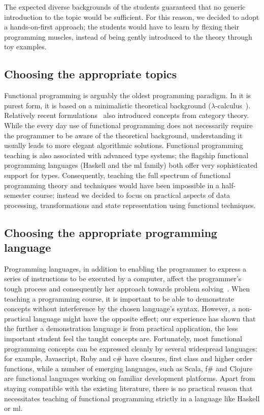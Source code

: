 \documentclass[conference]{IEEEtran}
\begin{document}
The expected diverse backgrounds of the students guaranteed that no generic
introduction to the topic would be sufficient. For this reason, we decided
to adopt a hands-on-first approach; the students would have to learn by
flexing their programming muscles, instead of being gently introduced to 
the theory through toy examples.

\subsection{Choosing the appropriate topics}

Functional programming is arguably the oldest programming paradigm. In it is
purest form, it is based on a minimalistic theoretical background
($\lambda$-calculus~\cite{Baren84}). Relatively recent
formulations~\cite{Meije91, Wadle93} also introduced concepts from category
theory. While the every day use of functional programming does not necessarily
require the programmer to be aware of the theoretical background, understanding
it usually leads to more elegant algorithmic solutions. Functional
programming teaching is also associated with advanced type systems; the flagship
functional programming languages (Haskell and the {\sc ml} family) both offer
very sophisticated support for types. Consequently, teaching the full spectrum
of functional programming theory and techniques would have been impossible in a
half-semester course; instead we decided to focus on practical aspects of data
processing, transformations and state representation using functional techniques.

\subsection{Choosing the appropriate programming language}

Programming languages, in addition to enabling the programmer to express a
series of instructions to be executed by a computer, affect the programmer's
tough process and consequently her approach towards problem
solving~\cite{Ivers80}.  When teaching a programming course, it is important to
be able to demonstrate concepts without interference by the chosen language's
syntax. However, a non-practical language might have the opposite effect; our
experience has shown that the further a demonstration language is from practical
application, the less important student feel the taught concepts are.
Fortunately, most functional programming concepts can be expressed cleanly by
several widespread languages: for example, Javascript, Ruby and {\sc c\#} have
closures, first class and higher order functions, while a number of emerging
languages, such as Scala, {\sc f\#} and Clojure are functional languages working
on familiar development platforms. Apart from staying compatible with the
existing literature, there is no practical reason that necessitates teaching of
functional programming strictly in a language like Haskell or {\sc ml}.
\end{document}
